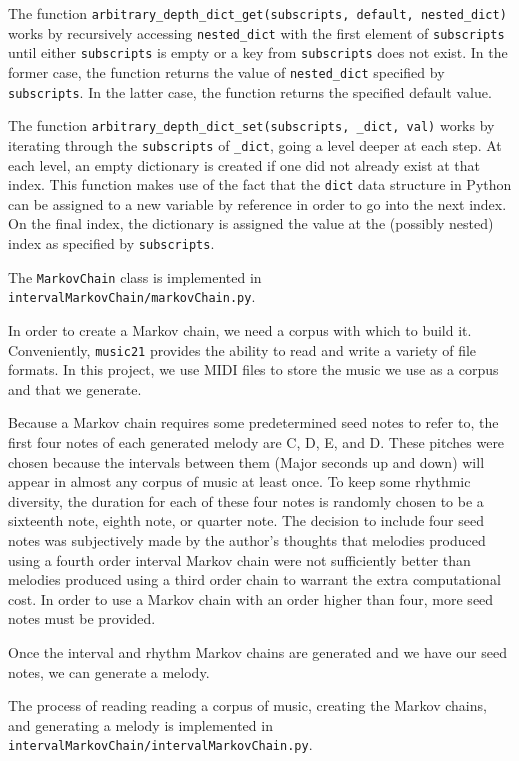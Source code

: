 The function \texttt{arbitrary\_depth\_dict\_get(subscripts, default, nested\_dict)} works by recursively accessing \texttt{nested\_dict} with the first element of \texttt{subscripts} until either \texttt{subscripts} is empty or a key from \texttt{subscripts} does not exist.
In the former case, the function returns the value of \texttt{nested\_dict} specified by \texttt{subscripts}.
In the latter case, the function returns the specified default value.

The function \texttt{arbitrary\_depth\_dict\_set(subscripts, \_dict, val)} works by iterating through the \texttt{subscripts} of \texttt{\_dict}, going a level deeper at each step.
At each level, an empty dictionary is created if one did not already exist at that index.
This function makes use of the fact that the \texttt{dict} data structure in Python can be assigned to a new variable by reference in order to go into the next index.
On the final index, the dictionary is assigned the value at the (possibly nested) index as specified by \texttt{subscripts}.

The \texttt{MarkovChain} class is implemented in \texttt{intervalMarkovChain/markovChain.py}.

In order to create a Markov chain, we need a corpus with which to build it.
Conveniently, \texttt{music21} provides the ability to read and write a variety of file formats.
In this project, we use MIDI files to store the music we use as a corpus and that we generate.

Because a Markov chain requires some predetermined seed notes to refer to, the first four notes of each generated melody are C, D, E, and D.
These pitches were chosen because the intervals between them (Major seconds up and down) will appear in almost any corpus of music at least once.
To keep some rhythmic diversity, the duration for each of these four notes is randomly chosen to be a sixteenth note, eighth note, or quarter note.
The decision to include four seed notes was subjectively made by the author's thoughts that melodies produced using a fourth order interval Markov chain were not sufficiently better than melodies produced using a third order chain to warrant the extra computational cost.
In order to use a Markov chain with an order higher than four, more seed notes must be provided.

Once the interval and rhythm Markov chains are generated and we have our seed notes, we can generate a melody.

The process of reading reading a corpus of music, creating the Markov chains, and generating a melody is implemented in \texttt{intervalMarkovChain/intervalMarkovChain.py}.

